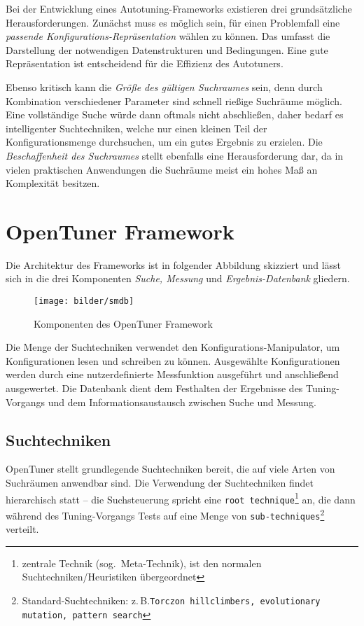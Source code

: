 \documentclass[a4paper,11pt]{scrartcl}
\newcommand{\zB}{\mbox{z.\,B.}\xspace}
\begin{document}
Bei der Entwicklung eines Autotuning-Frameworks existieren drei grundsätzliche Herausforderungen.
Zunächst muss es möglich sein, für einen Problemfall eine \emph{passende Konfigurations-Repräsentation} wählen
zu können. Das umfasst die Darstellung der notwendigen Datenstrukturen und Bedingungen. Eine gute 
Repräsentation ist entscheidend für die Effizienz des Autotuners. \newline 

Ebenso kritisch kann die \emph{Größe des gültigen Suchraumes} sein, denn durch Kombination 
verschiedener Parameter sind schnell rießige Suchräume möglich. Eine vollständige Suche würde 
dann oftmals nicht abschließen,
daher bedarf es intelligenter Suchtechniken, welche nur einen kleinen Teil der Konfigurationsmenge
durchsuchen, um ein gutes Ergebnis zu erzielen. Die \emph{Beschaffenheit des Suchraumes} stellt
ebenfalls eine Herausforderung dar, da in vielen praktischen Anwendungen die Suchräume meist ein
hohes Maß an Komplexität besitzen.

\newpage



\section{OpenTuner Framework}
Die Architektur des Frameworks ist in folgender Abbildung skizziert und lässt sich in die drei 
Komponenten \emph{Suche, Messung} und \emph{Ergebnis-Datenbank} gliedern.

\begin{figure}[h]
\begin{center}
\texttt{[image: bilder/smdb]}
\cite[S.~3]{OT-paper} \caption{Komponenten des OpenTuner Framework} 
\end{center}   
\end{figure}
\vspace{-.25cm} %

Die Menge der Suchtechniken verwendet den Konfigurations-Manipulator, um Konfigurationen lesen und 
schreiben zu können. Ausgewählte Konfigurationen werden durch eine nutzerdefinierte Messfunktion
ausgeführt und anschließend ausgewertet. Die Datenbank dient dem Festhalten der Ergebnisse des Tuning-Vorgangs
und dem Informationsaustausch zwischen Suche und Messung.


\subsection{Suchtechniken}
OpenTuner stellt grundlegende Suchtechniken bereit, die auf viele Arten von 
Suchräumen anwendbar sind. Die Verwendung der Suchtechniken findet hierarchisch statt --
die Suchsteuerung spricht eine \texttt{root technique}\footnote{zentrale Technik (sog.~Meta-Technik),
ist den normalen Suchtechniken/Heuristiken übergeordnet} an, die dann während des Tuning-Vorgangs 
Tests auf eine Menge von \texttt{sub-techniques}\footnote{Standard-Suchtechniken:
\zB \texttt{Torczon hillclimbers, evolutionary mutation, pattern search}} verteilt.  \newline
\end{document}
